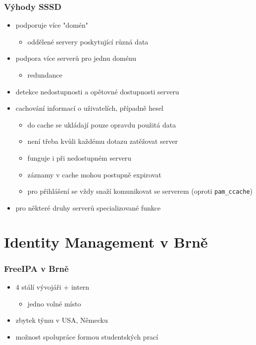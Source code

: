 \documentclass[pdftex,unicode,xcolor=table]{beamer}
\begin{document}
\begin{frame}[fragile]
    \frametitle{Výhody SSSD}
    \begin{itemize}
        \item podporuje více "domén"
        \begin{itemize}
            \item oddělené servery poskytující různá data
        \end{itemize}
        \item podpora více serverů pro jednu doménu
        \begin{itemize}
            \item redundance
        \end{itemize}
        \item detekce nedostupnosti a opětovné dostupnosti serveru
        \item cachování informací o uživatelích, případně hesel
        \begin{itemize}
            \item do cache se ukládají pouze opravdu použitá data
            \item není třeba kvůli každému dotazu zatěžovat server
            \item funguje i při nedostupném serveru
            \item záznamy v cache mohou postupně expirovat
            \item pro přihlášení se vždy snaží komunikovat se serverem (oproti \texttt{pam\_ccache})
        \end{itemize}
        \item pro některé druhy serverů specializované funkce
    \end{itemize}
\end{frame}

\section{Identity Management v Brně}
\begin{frame}
    \frametitle{FreeIPA v Brně}
    \begin{itemize}
        \item 4 stálí vývojáři + intern
        \begin{itemize}
            \item jedno volné místo
        \end{itemize}
        \item zbytek týmu v USA, Německu
        \item možnost spolupráce formou studentských prací
    \end{itemize}
\end{frame}
\end{document}
